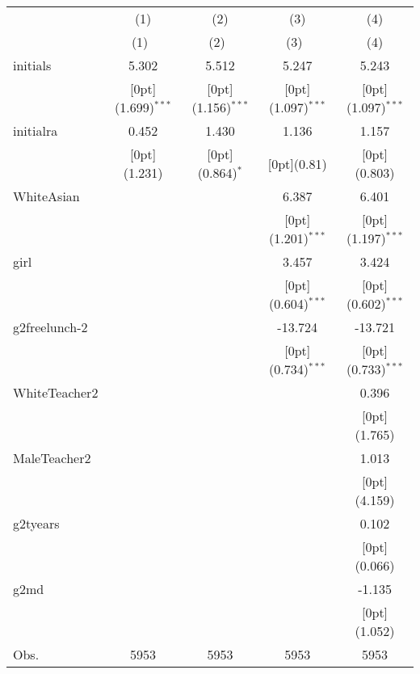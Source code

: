 \begin{tabular*}{\textwidth}{@{\extracolsep{\fill}}lcccc}				
	& \multicolumn{1}{c}{(1)} &	\multicolumn{1}{c}{(2)} &	\multicolumn{1}{c}{(3)} &	\multicolumn{1}{c}{(4)} \\
\cline{2-5}				
	& \multicolumn{1}{c}{(1)\mbox{\ }} &	\multicolumn{1}{c}{(2)\mbox{\ }} &	\multicolumn{1}{c}{(3)\mbox{\ }} &	\multicolumn{1}{c}{(4)} \\
\hline				
initials &	5.302 &	5.512 &	5.247 &	5.243 \\
&	\raisebox{.7ex}[0pt]{\scriptsize (1.699)$^{***}$} &	\raisebox{.7ex}[0pt]{\scriptsize (1.156)$^{***}$} &	\raisebox{.7ex}[0pt]{\scriptsize (1.097)$^{***}$} &	\raisebox{.7ex}[0pt]{\scriptsize (1.097)$^{***}$} \\
initialra &	0.452 &	1.430 &	1.136 &	1.157 \\
&	\raisebox{.7ex}[0pt]{\scriptsize (1.231)} &	\raisebox{.7ex}[0pt]{\scriptsize (0.864)$^{*}$} &	\raisebox{.7ex}[0pt]{\scriptsize (0.81)} &	\raisebox{.7ex}[0pt]{\scriptsize (0.803)} \\
WhiteAsian &	&	&	6.387 &	6.401 \\
&	&	&	\raisebox{.7ex}[0pt]{\scriptsize (1.201)$^{***}$} &	\raisebox{.7ex}[0pt]{\scriptsize (1.197)$^{***}$} \\
girl &	&	&	3.457 &	3.424 \\
&	&	&	\raisebox{.7ex}[0pt]{\scriptsize (0.604)$^{***}$} &	\raisebox{.7ex}[0pt]{\scriptsize (0.602)$^{***}$} \\
g2freelunch-2 &	&	&	-13.724 &	-13.721 \\
&	&	&	\raisebox{.7ex}[0pt]{\scriptsize (0.734)$^{***}$} &	\raisebox{.7ex}[0pt]{\scriptsize (0.733)$^{***}$} \\
WhiteTeacher2 &	&	&	&	0.396 \\
&	&	&	&	\raisebox{.7ex}[0pt]{\scriptsize (1.765)} \\
MaleTeacher2 &	&	&	&	1.013 \\
&	&	&	&	\raisebox{.7ex}[0pt]{\scriptsize (4.159)} \\
g2tyears &	&	&	&	0.102 \\
&	&	&	&	\raisebox{.7ex}[0pt]{\scriptsize (0.066)} \\
g2md &	&	&	&	-1.135 \\
&	&	&	&	\raisebox{.7ex}[0pt]{\scriptsize (1.052)} \\
Obs. &	5953 &	5953 &	5953 &	5953 \\
\hline\hline				
\end{tabular*}%

